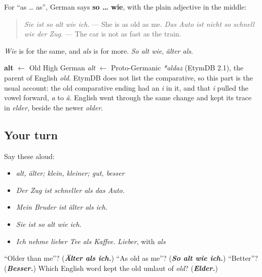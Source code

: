\begin{culture}
For \textquotedblleft{}as … as\textquotedblright{}, German says \textbf{so … wie}, with the plain adjective in the middle:

\begin{quote}
\emph{Sie ist so alt wie ich.} — She is as old as me. \emph{Das Auto ist nicht so schnell wie der Zug.} — The car is not as fast as the train.
\end{quote}

\emph{Wie} is for the same, and \emph{als} is for more. \emph{So alt wie}, \emph{älter als}.
\end{culture}

\begin{cousinweb}
\textbf{alt} $\leftarrow$ Old High German \emph{alt} $\leftarrow$ Proto-Germanic \emph{*aldaz} (EtymDB 2.1), the parent of English \emph{old}. EtymDB does not list the comparative, so this part is the usual account: the old comparative ending had an \emph{i} in it, and that \emph{i} pulled the vowel forward, \emph{a} to \emph{ä}. English went through the same change and kept its trace in \emph{elder}, beside the newer \emph{older}.
\end{cousinweb}

\subsection*{Your turn}
Say these aloud:

\begin{itemize}
\raggedright
  \item \emph{alt, älter; klein, kleiner; gut, besser}
  \item \emph{Der Zug ist schneller als das Auto.}
  \item \emph{Mein Bruder ist älter als ich.}
  \item \emph{Sie ist so alt wie ich.}
  \item \emph{Ich nehme lieber Tee als Kaffee.} \emph{Lieber}, with \emph{als}
\end{itemize}

\begin{tcolorbox}[breakable,colback=teal!4,colframe=teal!35!black,title={Before you move on}]
\textquotedblleft{}Older than me\textquotedblright{}? (\emph{\textbf{Älter als ich.}}) \textquotedblleft{}As old as me\textquotedblright{}? (\emph{\textbf{So alt wie ich.}}) \textquotedblleft{}Better\textquotedblright{}? (\emph{\textbf{Besser.}}) Which English word kept the old umlaut of \emph{old}? (\emph{\textbf{Elder.}})
\end{tcolorbox}

